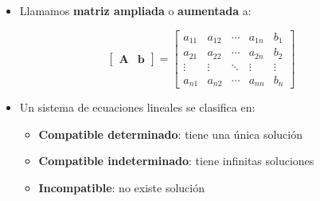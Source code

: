 \documentclass[openany]{book}
\providecommand{\tightlist}{%
  \setlength{\itemsep}{0pt}\setlength{\parskip}{0pt}}
\begin{document}
\begin{itemize}
\tightlist
\item
  Llamamos \textbf{matriz ampliada} o \textbf{aumentada} a:
\end{itemize}

\[
\begin{bmatrix}
    \mathbf{A} & \mathbf{b}
\end{bmatrix}
=
\begin{bmatrix}
a_{11} & a_{12} & \cdots & a_{1n} & b_1\\
a_{21} & a_{22} & \cdots & a_{2n} & b_2\\
\vdots & \vdots & \ddots & \vdots & \vdots\\
a_{n1} & a_{n2} & \cdots & a_{nn} & b_n 
\end{bmatrix}
\]

\begin{itemize}
\item
  Un sistema de ecuaciones lineales se clasifica en:

  \begin{itemize}
  \tightlist
  \item
    \textbf{Compatible determinado}: tiene una única solución
  \item
    \textbf{Compatible indeterminado}: tiene infinitas soluciones
  \item
    \textbf{Incompatible}: no existe solución
  \end{itemize}
\end{itemize}
\end{document}
